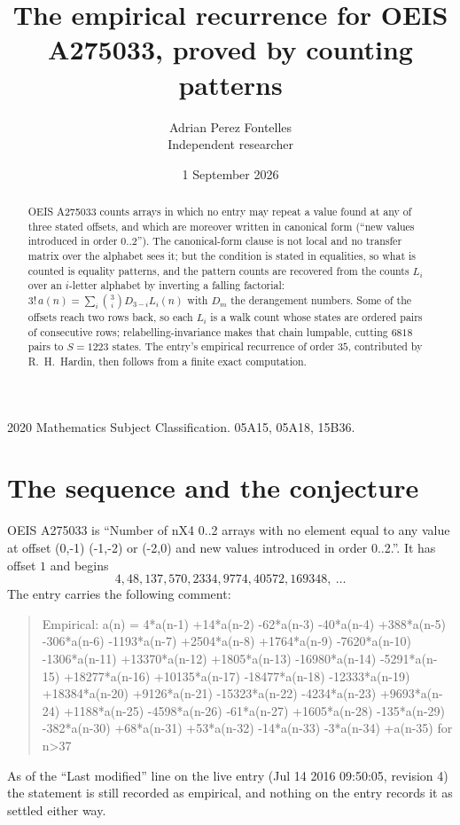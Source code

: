 \documentclass[11pt,a4paper]{article}
\title{The empirical recurrence for OEIS A275033, proved by counting patterns}
\author{Adrian Perez Fontelles\\ \small Independent researcher}
\date{1 September 2026}
\theoremstyle{plain}
\theoremstyle{definition}
\begin{document}
\maketitle

\begin{abstract}
OEIS A275033 counts arrays in which no entry may repeat a value found at any of three stated
offsets, and which are moreover written in canonical form (``new values introduced in order
$0..2$''). The canonical-form clause is not local and no transfer matrix over the
alphabet sees it; but the condition is stated in equalities, so what is counted is equality
patterns, and the pattern counts are recovered from the counts $L_i$ over an $i$-letter
alphabet by inverting a falling factorial:
$3!\,a(n)=\sum_i\binom{3}{i}D_{3-i}L_i(n)$ with $D_m$ the derangement numbers.
Some of the offsets reach two rows back, so each $L_i$ is a walk count whose states are
ordered pairs of consecutive rows; relabelling-invariance makes that chain lumpable,
cutting $6818$ pairs to $S=1223$ states. The entry's empirical recurrence of order $35$,
contributed by R.~H.~Hardin, then follows from a finite exact computation.
\end{abstract}

\noindent\small 2020 Mathematics Subject Classification. 05A15, 05A18, 15B36.\normalsize

\section{The sequence and the conjecture}

OEIS A275033 is ``Number of nX4 0..2 arrays with no element equal to any value at offset (0,-1) (-1,-2) or (-2,0) and new values introduced in order 0..2.''. It has offset $1$ and begins
\[
4, 48, 137, 570, 2334, 9774, 40572, 169348,\ \dots
\]
The entry carries the following comment:
\begin{quote}\small
Empirical: a(n) = 4*a(n-1) +14*a(n-2) -62*a(n-3) -40*a(n-4) +388*a(n-5) -306*a(n-6) -1193*a(n-7) +2504*a(n-8) +1764*a(n-9) -7620*a(n-10) -1306*a(n-11) +13370*a(n-12) +1805*a(n-13) -16980*a(n-14) -5291*a(n-15) +18277*a(n-16) +10135*a(n-17) -18477*a(n-18) -12333*a(n-19) +18384*a(n-20) +9126*a(n-21) -15323*a(n-22) -4234*a(n-23) +9693*a(n-24) +1188*a(n-25) -4598*a(n-26) -61*a(n-27) +1605*a(n-28) -135*a(n-29) -382*a(n-30) +68*a(n-31) +53*a(n-32) -14*a(n-33) -3*a(n-34) +a(n-35) for n>37
\end{quote}
As of the ``Last modified'' line on the live entry (Jul 14 2016 09:50:05, revision 4) the statement is
still recorded as empirical, and nothing on the entry records it as settled either way.
\end{document}
